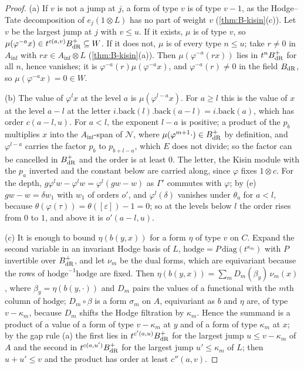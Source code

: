 \begin{proof}
(a) If $v$ is not a jump at $j$, a form of type $v$ is of type $v-1$, as the Hodge--Tate decomposition of $e_j(1\otimes L)$ has no part of weight $v$ (\cref{thm:B-kisin}(c)). Let $v$ be the largest jump at $j$ with $v\le u$. If it exists, $\mu$ is of type $v$, so
$\mu(\varphi^{-a}x)\in t^{c(a,v)}B_{\rm dR}^+\subseteq W$. If it does not, $\mu$ is of every type $n\le u$; take $r\ne0$ in $A_{\inf}$ with $rx\in A_{\inf}\otimes L$ (\cref{thm:B-kisin}(a)). Then $\mu(\varphi^{-a}(rx))$ lies in $t^nB_{\rm dR}^+$ for all $n$, hence vanishes; it is $\varphi^{-a}(r)\mu(\varphi^{-a}x)$, and $\varphi^{-a}(r)\ne0$ in the field $B_{\rm dR}$, so
$\mu(\varphi^{-a}x)=0\in W$.

(b) The value of $\varphi^lx$ at the level $a$ is $\mu(\varphi^{l-a}x)$. For $a\ge l$ this is the value of $x$ at the level $a-l$ at the letter $i.\mathrm{back}(l).\mathrm{back}(a-l)=i.\mathrm{back}(a)$, which has order $c(a-l,u)$. For $a<l$, the exponent $l-a$ is positive; a product of the $p_b$ multiplies $x$ into the
$A_{\inf}$-span of $\mathcal N$, where $\mu(\varphi^{m+1}\cdot)\in B_{\rm dR}^+$ by definition, and $\varphi^{l-a}$ carries the factor $p_b$ to $p_{b+l-a}$, which $E$ does not divide; so the factor can be cancelled in $B_{\rm dR}^+$ and the order is at least $0$. The letter, the Kisin
module with the $p_a$ inverted and the constant below are carried along, since $\varphi$ fixes $1\otimes c$. For the depth, $g\varphi^lw-\varphi^lw=\varphi^l(gw-w)$ as $\Gamma'$ commutes with $\varphi$; by (e) $gw-w=\delta w_1$ with $w_1$ of orders $o'$, and $\varphi^l(\delta)$
vanishes under $\theta_a$ for $a<l$, because $\theta(\varphi(\tau))=\theta([\varepsilon])-1=0$; so at the levels below $l$ the order rises from $0$ to $1$, and above it is $o'(a-l,u)$.

(c) It is enough to bound $\eta(b(y,x))$ for a form $\eta$ of type $v$ on $C$. Expand the second variable in an invariant Hodge basis of $L$, $\mathrm{hodge}=P\,\mathrm{diag}(t^{\kappa_m})$ with $P$ invertible over $B_{\rm dR}^+$, and let $\nu_m$ be the dual forms, which are equivariant because the rows of
$\mathrm{hodge}^{-1}\mathrm{hodge}$ are fixed. Then $\eta(b(y,x))=\sum_mD_m(\beta_y)\,\nu_m(x)$, where $\beta_y=\eta(b(y,\cdot))$ and $D_m$ pairs the values of a functional with the $m$th column of $\mathrm{hodge}$; $D_m\circ\beta$ is a form $\sigma_m$ on $A$, equivariant as $b$ and $\eta$
are, of type $v-\kappa_m$, because $D_m$ shifts the Hodge filtration by $\kappa_m$. Hence the summand is a product of a value of a form of type $v-\kappa_m$ at $y$ and of a form of type $\kappa_m$ at $x$; by the gap rule (a) the first lies in $t^{c'(a,u)}B_{\rm dR}^+$ for the largest jump $u\le v-\kappa_m$ of $A$ and
the second in $t^{c(a,u')}B_{\rm dR}^+$ for the largest jump $u'\le\kappa_m$ of $L$; then $u+u'\le v$ and the product has order at least $c''(a,v)$.


\end{proof}
